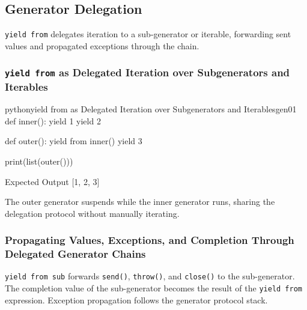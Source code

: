 \subsection{Generator Delegation}

\texttt{yield from} delegates iteration to a sub-generator or iterable, forwarding sent values and propagated exceptions through the chain.

\subsubsection{\texttt{yield from} as Delegated Iteration over Subgenerators and Iterables}

\begin{codebox}[]{python}{yield from as Delegated Iteration over Subgenerators and Iterables}{gen01}
def inner():
    yield 1
    yield 2

def outer():
    yield from inner()
    yield 3

print(list(outer()))
\end{codebox}


\begin{iobox}{Expected Output}
[1, 2, 3] \\
\end{iobox}




The outer generator suspends while the inner generator runs, sharing the delegation protocol without manually iterating.

\subsubsection{Propagating Values, Exceptions, and Completion Through Delegated Generator Chains}

\texttt{yield from sub} forwards \texttt{send()}, \texttt{throw()}, and \texttt{close()} to the sub-generator. The completion value of the sub-generator becomes the result of the \texttt{yield from} expression. Exception propagation follows the generator protocol stack.
